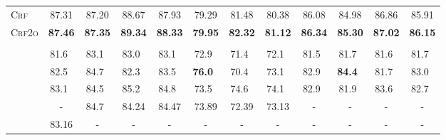 \documentclass[11pt]{article}
\newcommand{\white}[1]{\textcolor{white}{#1}}
\begin{document}
\begin{table*}[tb!]
\begin{small}
\begin{tabular}{L c ccc ccc c ccc}
            \hdashline[1pt/3pt]
            \textsc{Crf}                            & 87.31                       & 87.20                       & 88.67                     & 87.93          & 79.29                    & 81.48          & 80.38          & 86.08          & 84.98                  & 86.86          & 85.91          \\
            \textsc{Crf2o}                          & \textbf{87.46}              & \textbf{87.35}              & \textbf{89.34}            & \textbf{88.33} & \textbf{79.95}           & \textbf{82.32} & \textbf{81.12} & \textbf{86.34} & \textbf{85.30}         & \textbf{87.02} & \textbf{86.15} \\
                                                                                                                                                                                                                                                             \\
            \citet{he-etal-2017-deep}                                         & 81.6\white{0}               & 83.1\white{0}               & 83.0\white{0}             & 83.1\white{0}  & 72.9\white{0}            & 71.4\white{0}  & 72.1\white{0}  & 81.5\white{0}  & 81.7\white{0}          & 81.6\white{0}  & 81.7\white{0}  \\
            \citet{ouchi-etal-2018-span}                                      & 82.5\white{0}               & 84.7\white{0}               & 82.3\white{0}             & 83.5\white{0}  & \textbf{76.0\white{0}}   & 70.4\white{0}  & 73.1\white{0}  & 82.9\white{0}  & \textbf{84.4\white{0}} & 81.7\white{0}  & 83.0\white{0}  \\
            \citet{tan-etal-2018-deep}                                        & 83.1\white{0}               & 84.5\white{0}               & 85.2\white{0}             & 84.8\white{0}  & 73.5\white{0}            & 74.6\white{0}  & 74.1\white{0}  & 82.9\white{0}  & 81.9\white{0}          & 83.6\white{0}  & 82.7\white{0}  \\
            \citet{strubell-etal-2018-lisa}                                   & -                           & 84.7\white{0}               & 84.24                     & 84.47          & 73.89                    & 72.39          & 73.13          & -              & -                      & -              & -              \\
            \citet{zhou-etal-2020-parsing}                                    & 83.16                       & -                           & -                         & -              & -                        & -              & -              & -              & -                      & -              & -              \\

\end{tabular}
\end{small}
\end{table*}
\end{document}

